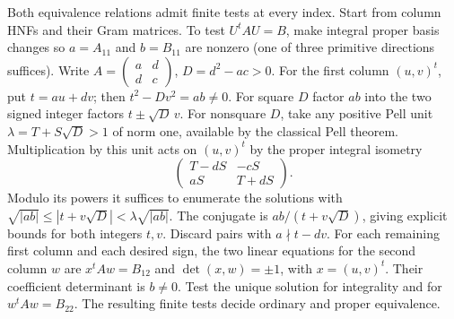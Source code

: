 Both equivalence relations admit finite tests at every index.
Start from column HNFs and their Gram matrices. To test \(U^t A U=B\), make integral proper basis changes so \(a=A_{11}\) and \(b=B_{11}\) are nonzero (one of three primitive directions suffices). Write \(A=\left(\begin{smallmatrix}a&d\\d&c\end{smallmatrix}\right)\), \(D=d^2-ac>0\). For the first column \((u,v)^t\), put \(t=au+dv\); then \(t^2-Dv^2=ab\ne0\). For square \(D\) factor \(ab\) into the two signed integer factors \(t\pm\sqrt D\,v\). For nonsquare \(D\), take any positive Pell unit \(\lambda=T+S\sqrt D>1\) of norm one, available by the classical Pell theorem. Multiplication by this unit acts on \((u,v)^t\) by the proper integral isometry
\[
 \begin{pmatrix}T-dS&-cS\\ aS&T+dS\end{pmatrix}.
\]
Modulo its powers it suffices to enumerate the solutions with
\(\sqrt{|ab|}\le |t+v\sqrt D|<\lambda\sqrt{|ab|}\). The conjugate is \(ab/(t+v\sqrt D)\), giving explicit bounds for both integers \(t,v\). Discard pairs with \(a\nmid t-dv\). For each remaining first column and each desired sign, the two linear equations for the second column \(w\) are \(x^tAw=B_{12}\) and \(\det(x,w)=\pm1\), with \(x=(u,v)^t\). Their coefficient determinant is \(b\ne0\). Test the unique solution for integrality and for \(w^tAw=B_{22}\). The resulting finite tests decide ordinary and proper equivalence.

